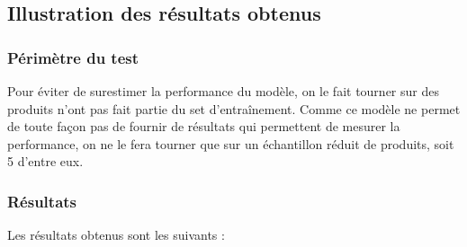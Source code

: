         \subsection{Illustration des résultats obtenus}
    
            \subsubsection{Périmètre du test}
            
            Pour éviter de surestimer la performance du modèle, on le fait tourner sur des produits n'ont pas fait partie du set d'entraînement.            
            Comme ce modèle ne permet de toute façon pas de fournir de résultats qui permettent de mesurer la performance, on ne le fera tourner que sur un échantillon réduit de produits, soit 5 d'entre eux.

            \subsubsection{Résultats}

            Les résultats obtenus sont les suivants :

